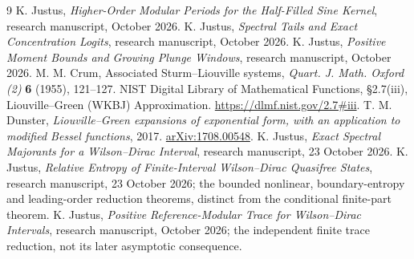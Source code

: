 \documentclass[10pt]{article}
\begin{document}
\begin{thebibliography}{9}
 K. Justus, \emph{Higher-Order Modular Periods for the
Half-Filled Sine Kernel}, research manuscript, October 2026.
 K. Justus, \emph{Spectral Tails and Exact Concentration
Logits}, research manuscript, October 2026.
 K. Justus, \emph{Positive Moment Bounds and Growing
Plunge Windows}, research manuscript, October 2026.
 M. M. Crum, Associated Sturm--Liouville systems,
\emph{Quart. J. Math. Oxford (2)} \textbf{6} (1955), 121--127.
 NIST Digital Library of Mathematical Functions,
\S2.7(iii), Liouville--Green (WKBJ) Approximation.
\url{https://dlmf.nist.gov/2.7#iii}.
 T. M. Dunster, \emph{Liouville--Green expansions
of exponential form, with an application to modified Bessel functions},
2017. \href{https://arxiv.org/abs/1708.00548}{arXiv:1708.00548}.
 K. Justus, \emph{Exact Spectral Majorants for a
Wilson--Dirac Interval}, research manuscript, 23 October 2026.
 K. Justus, \emph{Relative Entropy of Finite-Interval
Wilson--Dirac Quasifree States}, research manuscript, 23 October 2026;
the bounded nonlinear, boundary-entropy and leading-order reduction
theorems, distinct from the conditional finite-part theorem.
 K. Justus, \emph{Positive Reference-Modular
Trace for Wilson--Dirac Intervals}, research manuscript, October 2026;
the independent finite trace reduction, not its later asymptotic consequence.
\end{thebibliography}
\end{document}
